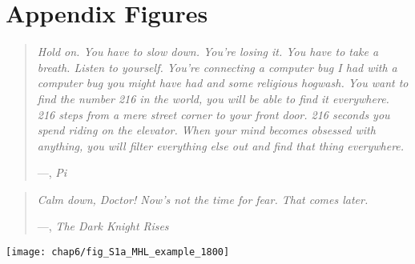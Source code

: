\chapter{Appendix Figures}

\begin{quote}
  \emph{Hold on. You have to slow down. You're losing it. You have to take a breath. Listen to yourself. You're connecting a computer bug I had with a computer bug you might have had and some religious hogwash. You want to find the number 216 in the world, you will be able to find it everywhere. 216 steps from a mere street corner to your front door. 216 seconds you spend riding on the elevator. When your mind becomes obsessed with anything, you will filter everything else out and find that thing everywhere.}
  
  \begin{flushright}
    —, \emph{Pi}
  \end{flushright}
\end{quote}

\vspace{1em}

\begin{quote}
  \emph{Calm down, Doctor! Now's not the time for fear. That comes later.}
  
  \begin{flushright}
    —, \emph{The Dark Knight Rises}
  \end{flushright}
\end{quote}

\fancyhfoffset[E,O]{0pt}

%
%

\begin{figure*}[p]
  \centering
  \texttt{[image: chap6/fig\_S1a\_MHL\_example\_1800]}
\end{figure*}

